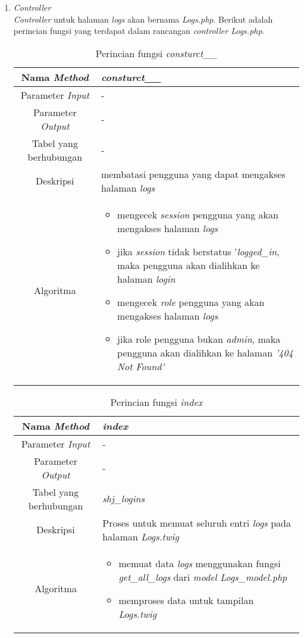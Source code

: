 \begin{enumerate}
	\item \textit{Controller} \\
	\textit{Controller} untuk halaman \textit{logs} akan bernama \textit{Logs.php}. Berikut adalah perincian fungsi yang terdapat dalam rancangan \textit{controller Logs.php}.
	\begin{table}[H]
		\caption{Perincian fungsi \textit{consturct\_\_}}
		\begin{tabular}{|c|p{11cm}|}
			\hline
			Nama \textit{Method} 	& 	\textit{consturct\_\_} 	\\
			\hline
			Parameter \textit{Input} & - \\
			\hline
			Parameter \textit{Output} &  - \\
			\hline
			Tabel yang berhubungan & - \\
			\hline
			Deskripsi	& membatasi pengguna yang dapat mengakses halaman \textit{logs}	 \\
			\hline
			Algoritma	& \begin{itemize}
				\item mengecek \textit{session} pengguna yang akan mengakses halaman \textit{logs}
				\item jika \textit{session} tidak berstatus '\textit{logged\_in}, maka pengguna akan dialihkan ke halaman \textit{login}
				\item mengecek \textit{role} pengguna yang akan mengakses halaman \textit{logs}
				\item jika role pengguna bukan \textit{admin}, maka pengguna akan dialihkan ke halaman \textit{'404 Not Found'}
			\end{itemize} \\
			\hline
		\end{tabular}
	\end{table}
	
	\begin{table}[H]
		\caption{Perincian fungsi \textit{index}}
		\begin{tabular}{|c|p{11cm}|}
			\hline
			Nama \textit{Method} 	& 	\textit{index} 	\\
			\hline
			Parameter \textit{Input} & - \\
			\hline
			Parameter \textit{Output} &  - \\
			\hline
			Tabel yang berhubungan & \textit{shj\_logins} \\
			\hline
			Deskripsi	& Proses untuk memuat seluruh entri \textit{logs} pada halaman \textit{Logs.twig}	 \\
			\hline
			Algoritma	& \begin{itemize}
				\item memuat data \textit{logs} menggunakan fungsi \textit{get\_all\_logs} dari \textit{model Logs\_model.php}
				\item memproses data untuk tampilan \textit{Logs.twig}
			\end{itemize} \\
			\hline
		\end{tabular}
	\end{table}
\end{enumerate}
